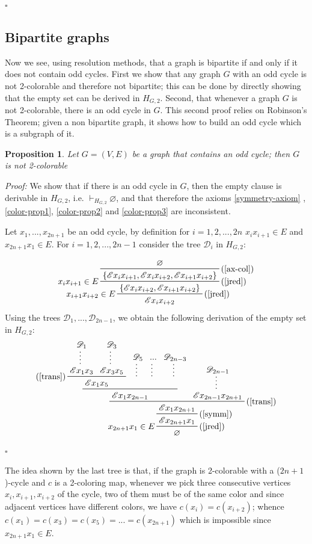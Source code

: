 \documentclass[a4paper,12pt,oneside]{book}
\newtheorem{proposition}[theorem]{Proposition}
\newcommand{\E}{\mathscr{E}}
\newcommand{\D}{\mathscr{D}}
\newcommand*{\QED}{\hfill\ensuremath{\square}}
\let\emptyset\varnothing
\begin{document}
\QED


\subsection*{Bipartite graphs}
Now we see, using resolution methods, that a graph is bipartite  if and only if it does not contain odd cycles. First we show that any graph $G$ with an odd cycle is not 2-colorable and therefore not bipartite; this can be done by directly showing that the empty set can be derived in $H_{G,2}$. 
Second, that whenever a graph $G$ is not 2-colorable, there is an odd cycle in $G$. This second proof relies on Robinson's Theorem; given a non bipartite graph, it shows how to build an odd cycle which is a subgraph of it. 

\begin{proposition}
Let $G=(V,E)$ be a graph that contains an odd cycle; then $G$ is not 2-colorable 
\end{proposition}
\textit{Proof:}
We show that if there is an odd cycle in $G$, then the empty clause is derivable in $H_ {G,2}$, i.e. $\vdash_{H_{G,2}} \emptyset$, and that therefore the axioms \ref{symmetry-axiom} ,\ref{color-prop1}, \ref{color-prop2} and \ref{color-prop3} are inconsistent.

Let $x_1, ..., x_{2n+1} $ be an odd cycle, by definition for $i=1,2,..., 2n$ $x_i x_{i+1} \in E$ and $ x_{2n+1} x_1 \in E$. For $i=1,2,...,2n-1$ consider the tree $\D_i$ in $H_{G,2}$:

$$
\prftree[r,l]{(\ref{jred})}{$x_{i+1} x_{i+2} \in E$}{
\prftree[r,l]{(\ref{jred})}{$x_i x_{i+1} \in E$} 
{ \prftree[r]{(\ref{ax-col})}{\emptyset}
{\{\E x_i x_{i+1} , \E x_{i} x_{i+2} , \E x_{i+1} x_{i+2}\}}}
{\{ \E x_{i} x_{i+2} , \E x_{i+1} x_{i+2}  \}}
}
{\E x_i x_{i+2}}
$$
\newpage Using the trees $\D_1,...,\D_{2n-1}$, we obtain the following derivation of the empty set in $H_{G,2}$:
$$
\prftree[r,l]{(\ref{jred})}{$x_{2n+1}x_1\in E$}
{ \prftree[r]{(\ref{symm})}
{\prftree[r]{(\ref{trans})} 
{\prftree{ \prftree[l]{(\ref{trans})}{ \prfsummary{\D_1} {\E x_1x_3}  }{  \prfsummary{\D_3}{\E x_3x_5} }
{\E x_1 x_5}}{\prfsummary{ \D_5}{ }}{ \prfsummary{...}{} }{\prfsummary{ \D_{2n-3}}{ }}
{ \E x_1 x_{2n-1}}}{\prfsummary{\D_{2n-1}} { \E x_{2n-1}x_{2n+1}}}
{\E x_1 x_{2n+1} } }  
{\E x_{2n+1}x_1} }
{\emptyset}
$$
\QED

The idea shown by the last tree is that, if the graph is 2-colorable with a ($2n+1$)-cycle and $c$ is a 2-coloring map, whenever we pick three consecutive vertices $x_i,x_{i+1},x_{i+2}$ of the cycle, two of them must be of the same color and since adjacent vertices have different colors, we have $c(x_i)=c(x_{i+2})$; whence $c(x_1)=c(x_3)=c(x_5)=...=c(x_{2n+1})$ which is impossible since $x_{2n+1}x_1 \in E$.
\end{document}

